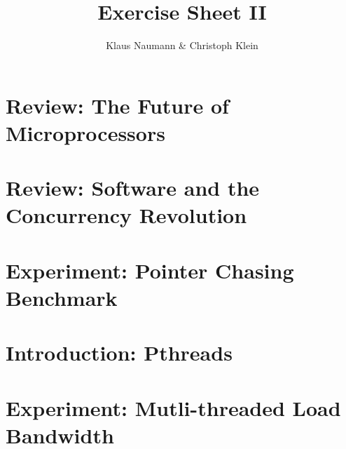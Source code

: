 \documentclass[DIV=12,oneside,a4paper]{scrartcl}
\begin{document}

\title{Exercise Sheet II}
\subject{Advanced Parallel Computing}
\author{Klaus Naumann \& Christoph Klein}
\maketitle




\section{Review: The Future of Microprocessors}

\section{Review: Software and the Concurrency Revolution}
       

\section{Experiment: Pointer Chasing Benchmark}


\section{Introduction: Pthreads}


\section{Experiment: Mutli-threaded Load Bandwidth}
\end{document}
